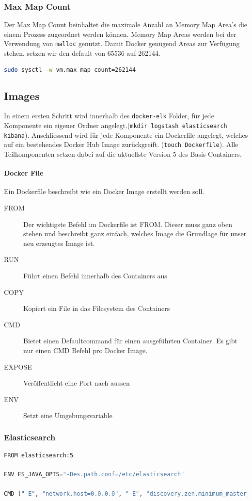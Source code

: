 \subsubsection{Max Map Count}
Der Max Map Count beinhaltet die maximale Anzahl an Memory Map Area's die einem Prozess zugeordnet werden können. Memory Map Areas werden bei der Verwendung von \lstinline[]|malloc| genutzt. Damit Docker genügend Areas zur Verfügung stehen, setzen wir den default von 65536 auf 262144.
\begin{lstlisting}[language=bash]
sudo sysctl -w vm.max_map_count=262144
\end{lstlisting}

\subsection{Images}
In einem ersten Schritt wird innerhalb des \lstinline[]|docker-elk| Folder, für jede Komponente ein eigener Ordner angelegt.(\lstinline[]|mkdir logstash elasticsearch kibana|). Anschliessend wird für jede Komponente ein Dockerfile angelegt, welches auf ein bestehendes Docker Hub Image zurückgreift. (\lstinline[]|touch Dockerfile|). Alle Teilkomponenten setzen dabei auf die aktuellste Version 5 des Basis Containers.

\paragraph{Docker File}
Ein Dockerfile beschreibt wie ein Docker Image erstellt werden soll. 
\begin{description}
	\item[FROM] Der wichtigste Befehl im Dockerfile ist FROM. Dieser muss ganz oben stehen und beschreibt ganz einfach, welches Image die Grundlage für unser neu erzeugtes Image ist.	
	\item[RUN] Führt einen Befehl innerhalb des Containers aus
	\item[COPY] Kopiert ein File in das Filesystem des Containers
	\item[CMD] Bietet einen Defaultcommand für einen ausgeführten Container. Es gibt nur einen CMD Befehl pro Docker Image.
	\item[EXPOSE] Veröffentlicht eine Port nach aussen
	\item[ENV] Setzt eine Umgebungsvariable
\end{description}

\subsubsection{Elasticsearch}
\begin{lstlisting}[caption=Elasticsearch Dockerfile, language=bash]
FROM elasticsearch:5

ENV ES_JAVA_OPTS="-Des.path.conf=/etc/elasticsearch"

CMD ["-E", "network.host=0.0.0.0", "-E", "discovery.zen.minimum_master_nodes=1"]
\end{lstlisting}

